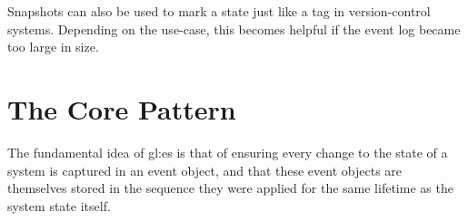 Snapshots can also be used to mark a state just like a tag in version-control systems. Depending on the use-case, this becomes helpful if the event log became too large in size.





\section{The Core Pattern}\label{sec:escp}

The fundamental idea of \gls{gl:es} is that of ensuring every change to the state of a system is captured in an event object, and that these event objects are themselves stored in the sequence they were applied for the same lifetime as the system state itself.


